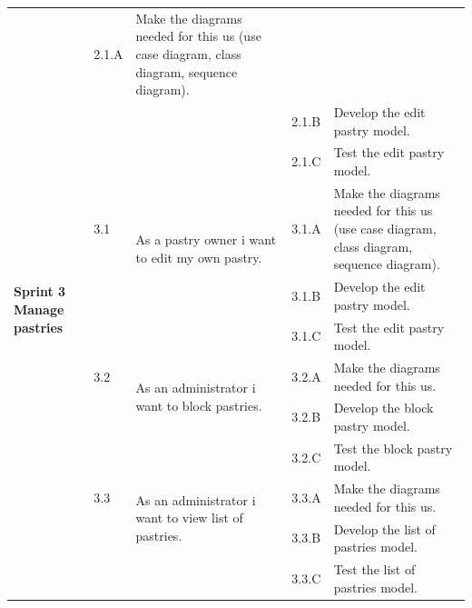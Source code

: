 \documentclass[12pt,a4paper]{report}
\begin{document}
\begin{table}[H]
\begin{center}
\begin{tabular}{|  p{3cm}|  p{1cm}| p{4cm}|  p{1cm}| p{6cm}|}
			&				                      
			2.1.A &                        
			Make the diagrams needed for this \ac{us} (use case diagram, class diagram, sequence diagram).
			\\ 
			\cline{4-5}    
			&                   
			&                                 
			&                        
			2.1.B &                        
			Develop the edit pastry model.
			\\ 
			\cline{4-5}    
			&                   
			&                                 
			&                        
			2.1.C &                        
			Test the edit pastry model.
			\\ \hline
			\multirow{5}{3cm}{\textbf{Sprint 3} \textbf{Manage pastries} }
			&                       
			3.1  &  
			\multirow{2}{4cm}{As a pastry owner i want to edit my own pastry.}
			
			&				                      
			3.1.A &                        
			Make the diagrams needed for this \ac{us} (use case diagram, class diagram, sequence diagram).
			\\ 
			\cline{4-5}    
			&                   
			&                                 
			&                        
			3.1.B &                        
			Develop the edit pastry model.
			\\ 
			\cline{4-5}    
			&                   
			&                                 
			&                        
			3.1.C &                        
			Test the edit pastry model.
			\\
			\cline{2-5}  
			
			&                       
			3.2  &  
			\multirow{2}{4cm}{As an administrator i want to block pastries.}
			
			&				                      
			3.2.A &                        
			Make the diagrams needed for this \ac{us}.
			\\ 
			\cline{4-5}    
			&                   
			&                                 
			&                        
			3.2.B &                        
			Develop the block pastry model.
			\\ 
			\cline{4-5}    
			&                   
			&                                 
			&                        
			3.2.C &                        
			Test the block pastry model.
			\\
			\cline{2-5}  
			
			&                       
			3.3  &  
			\multirow{2}{4cm}{As an administrator i want to view list of pastries.}
			
			&				                      
			3.3.A &                        
			Make the diagrams needed for this \ac{us}.
			\\ 
			\cline{4-5}    
			&                   
			&                                 
			&                        
			3.3.B &                        
			Develop the list of pastries model.
			\\ 
			\cline{4-5}    
			&                   
			&                                 
			&                        
			3.3.C &                        
			Test the list of pastries model.
			

\end{tabular}
\end{center}
\end{table}
\end{document}
